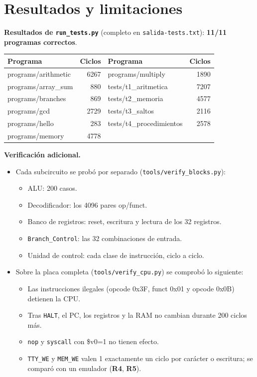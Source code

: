 \documentclass[10pt,a4paper]{article}
\newcommand{\s}[1]{\texttt{#1}}
\begin{document}
\section{Resultados y limitaciones}

\noindent\textbf{Resultados de \s{run\_tests.py}} (completo en \s{salida-tests.txt}):
\textbf{11/11 programas correctos}.

\begin{center}\small
\begin{tabular}{@{}lr@{\qquad}lr@{}}
\toprule
Programa & Ciclos & Programa & Ciclos \\
\midrule
programs/arithmetic & 6267 & programs/multiply & 1890 \\
programs/array\_sum & 880 & tests/t1\_aritmetica & 7207 \\
programs/branches & 869 & tests/t2\_memoria & 4577 \\
programs/gcd & 2729 & tests/t3\_saltos & 2116 \\
programs/hello & 283 & tests/t4\_procedimientos & 2578 \\
programs/memory & 4778 & & \\
\bottomrule
\end{tabular}
\end{center}

\noindent\textbf{Verificación adicional.}
\begin{itemize}
\item Cada subcircuito se probó por separado (\s{tools/verify\_blocks.py}):
  \begin{itemize}
  \item ALU: 200 casos.
  \item Decodificador: los 4096 pares op/funct.
  \item Banco de registros: reset, escritura y lectura de los 32 registros.
  \item \s{Branch\_Control}: las 32 combinaciones de entrada.
  \item Unidad de control: cada clase de instrucción, ciclo a ciclo.
  \end{itemize}
\item Sobre la placa completa (\s{tools/verify\_cpu.py}) se comprobó lo siguiente:
  \begin{itemize}
  \item Las instrucciones ilegales (opcode 0x3F, funct 0x01 y opcode 0x0B) detienen la CPU.
  \item Tras \s{HALT}, el PC, los registros y la RAM no cambian durante 200 ciclos más.
  \item \s{nop} y \s{syscall} con \$v0=1 no tienen efecto.
  \item \s{TTY\_WE} y \s{MEM\_WE} valen 1 exactamente un ciclo por carácter o escritura; se comparó con un emulador (\textbf{R4}, \textbf{R5}).
  \end{itemize}
\end{itemize}
\end{document}
